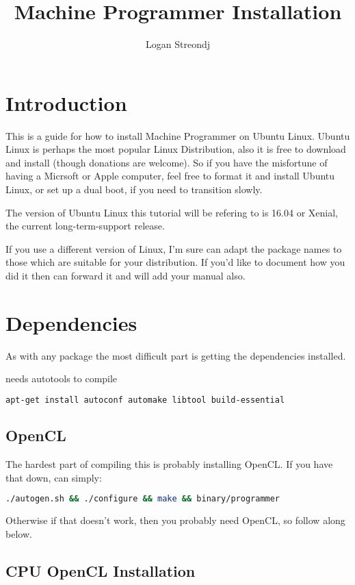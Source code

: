 \documentclass[12pt]{article}
\title{Machine Programmer Installation}
\author{Logan Streondj}
\begin{document}
\maketitle
\tableofcontents
\section{Introduction}
This is a guide for how to install Machine Programmer on Ubuntu Linux.
Ubuntu Linux is perhaps the most popular Linux Distribution,
also it is free to download and install (though donations are welcome).
So if you have the misfortune of having a Micrsoft or Apple computer, 
feel free to format it and install Ubuntu Linux,
or set up a dual boot, if you need to transition slowly.  

The version of Ubuntu Linux this tutorial will be refering to is 16.04 or
Xenial, the current long-term-support release. 

If you use a different version of Linux, I'm sure can adapt the package names to
those which are suitable for your distribution.  If you'd like to document how
you did it then can forward it and will add your manual also.

\section{Dependencies}
As with any package the most difficult part is getting the dependencies
installed.

needs autotools to compile
\begin{lstlisting}[language=bash]
apt-get install autoconf automake libtool build-essential
\end{lstlisting}

\subsection{OpenCL}
The hardest part of compiling this is probably installing OpenCL.
If you have that down, can simply:
\begin{lstlisting}[language=bash]
./autogen.sh && ./configure && make && binary/programmer
\end{lstlisting}

Otherwise if that doesn't work, then you probably need OpenCL,
so follow along below.

\subsection{CPU OpenCL Installation}
\end{document}
